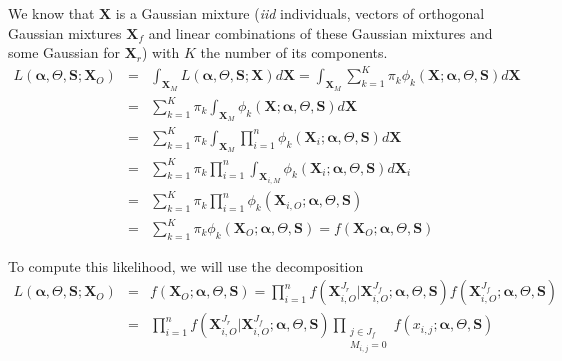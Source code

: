 \documentclass[12pt,a4paper]{report}
\begin{document}
We know that $\boldsymbol{X}$ is a Gaussian mixture ({\it iid} individuals, vectors of orthogonal Gaussian mixtures $\boldsymbol{X}_f$ and linear combinations of these Gaussian mixtures and some Gaussian for $\boldsymbol{X}_r$) with $K$ the number of its components.
\begin{eqnarray}
	L(\boldsymbol{\alpha},\Theta,\boldsymbol{S};\boldsymbol{X}_O)&=&\int_{\boldsymbol{X}_M}L(\boldsymbol{\alpha},\Theta,\boldsymbol{S};\boldsymbol{X})d\boldsymbol{X} 
	=\int_{\boldsymbol{X}_M}\sum_{k=1}^K \pi_k \phi_k(\boldsymbol{X};\boldsymbol{\alpha},\Theta,\boldsymbol{S})d\boldsymbol{X} \\
	&=&\sum_{k=1}^K \pi_k \int_{\boldsymbol{X}_M}\phi_k(\boldsymbol{X};\boldsymbol{\alpha},\Theta,\boldsymbol{S})d\boldsymbol{X} \\
	&=&\sum_{k=1}^K \pi_k \int_{\boldsymbol{X}_M}\prod_{i=1}^n\phi_k(\boldsymbol{X}_i;\boldsymbol{\alpha},\Theta,\boldsymbol{S})d\boldsymbol{X} \\
	&=&\sum_{k=1}^K \pi_k \prod_{i=1}^n\int_{\boldsymbol{X}_{i,M}}\phi_k(\boldsymbol{X}_i;\boldsymbol{\alpha},\Theta,\boldsymbol{S})d\boldsymbol{X}_i \\
	&=&\sum_{k=1}^K \pi_k \prod_{i=1}^n\phi_k(\boldsymbol{X}_{i,O};\boldsymbol{\alpha},\Theta,\boldsymbol{S})\\
	&=&\sum_{k=1}^K \pi_k \phi_k(\boldsymbol{X}_{O};\boldsymbol{\alpha},\Theta,\boldsymbol{S})=f(\boldsymbol{X}_{O};\boldsymbol{\alpha},\Theta,\boldsymbol{S})
\end{eqnarray}






To compute this likelihood, we will use the decomposition
\begin{eqnarray}
	L(\boldsymbol{\alpha},\Theta,\boldsymbol{S};\boldsymbol{X}_O)&=&f(\boldsymbol{X}_{O};\boldsymbol{\alpha},\Theta,\boldsymbol{S})=\prod_{i=1}^nf(\boldsymbol{X}^{J_r}_{i,O}|\boldsymbol{X}^{J_f}_{i,O};\boldsymbol{\alpha},\Theta,\boldsymbol{S})f(\boldsymbol{X}^{J_f}_{i,O};\boldsymbol{\alpha},\Theta,\boldsymbol{S}) \\
	&=&\prod_{i=1}^nf(\boldsymbol{X}^{J_r}_{i,O}|\boldsymbol{X}^{J_f}_{i,O};\boldsymbol{\alpha},\Theta,\boldsymbol{S})\prod_{\substack{j \in J_f \\ M_{i,j}=0}}f(x_{i,j};\boldsymbol{\alpha},\Theta,\boldsymbol{S})
\end{eqnarray}
\end{document}
